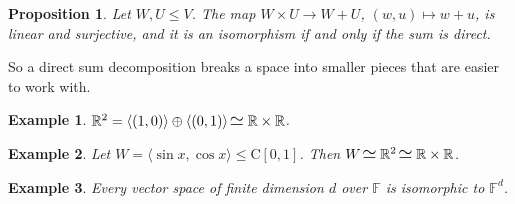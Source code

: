 \documentclass[12pt]{article}
\newcommand{\iso}{\scaleobj{1.3}{\hspace{1pt}{\simeq} \hspace{2pt}}}
\theoremstyle{breakplain}
\newtheorem{prop}[theorem]{Proposition}
\theoremstyle{breakdef}
\newtheorem*{example}{Example}
\theoremstyle{remark}
\begin{document}
\begin{prop}
    Let $W,U\leq V$. The map $W\times U\to W+U$, $(w,u)\mapsto w+u$, is linear and surjective, and it is an isomorphism if and only if the sum is direct.
\end{prop}
So a direct sum decomposition breaks a space into smaller pieces that are easier to work with.
\begin{example}
    $\mathbb{R}^2=\langle (1,0)\rangle \oplus\langle (0,1)\rangle\iso \mathbb{R} \times \mathbb{R}$.
\end{example}
\begin{example}
    Let $W=\langle \sin x,\cos x\rangle\leq\mathrm{C}[0,1]$. Then $W\iso \mathbb{R}^2\iso \mathbb{R}\times\mathbb{R}$.
\end{example}
\begin{example}
    Every vector space of finite dimension $d$ over $\mathbb{F}$ is isomorphic to $\mathbb{F}^d$.
\end{example}

\newpage
\end{document}
